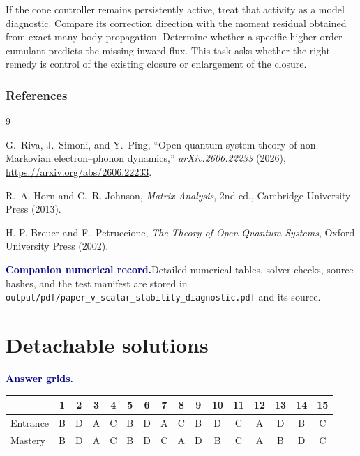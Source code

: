 \documentclass[10pt]{article}
\newcommand{\sourcepath}[1]{\nolinkurl{#1}}
\newcommand{\pedbox}[2]{%
  \par\medskip
  \noindent\colorbox{pale}{%
    \parbox{\dimexpr\linewidth-2\fboxsep\relax}{%
      \textcolor{navy}{\textbf{#1}}\quad #2%
    }%
  }\par\medskip
}
\newcommand{\flowlead}[1]{%
  \par\medskip
  \needspace{3\baselineskip}%
  \noindent\textcolor{navy}{\textbf{#1.}}\enspace\ignorespaces
}
\begin{document}
If the cone controller remains persistently active, treat that activity as a
model diagnostic.  Compare its correction direction with the moment residual
obtained from exact many-body propagation.  Determine whether a specific
higher-order cumulant predicts the missing inward flux.  This task asks
whether the right remedy is control of the existing closure or enlargement of
the closure.

\clearpage
\section*{References}

\begin{thebibliography}{9}

G.~Riva, J.~Simoni, and Y.~Ping,
\newblock ``Open-quantum-system theory of non-Markovian electron--phonon
dynamics,''
\newblock \emph{arXiv:2606.22233} (2026),
\newblock \url{https://arxiv.org/abs/2606.22233}.

R.~A. Horn and C.~R. Johnson,
\newblock \emph{Matrix Analysis}, 2nd ed.,
\newblock Cambridge University Press (2013).

H.-P. Breuer and F.~Petruccione,
\newblock \emph{The Theory of Open Quantum Systems},
\newblock Oxford University Press (2002).

\end{thebibliography}

\pedbox{Companion numerical record.}{Detailed numerical tables, solver
checks, source hashes, and the test manifest are stored in
\sourcepath{output/pdf/paper_v_scalar_stability_diagnostic.pdf} and its
source.}

\clearpage
\appendix
\part*{Detachable solutions}

\flowlead{Answer grids}

\begin{center}
\scriptsize
\setlength{\tabcolsep}{2.2pt}
\begin{tabular}{@{}lccccccccccccccc@{}}
\toprule
&1&2&3&4&5&6&7&8&9&10&11&12&13&14&15\\
\midrule
Entrance&B&D&A&C&B&D&A&C&B&D&C&A&D&B&C\\
Mastery&B&D&A&C&B&D&C&A&D&B&C&A&B&D&C\\
\bottomrule
\end{tabular}
\end{center}
\end{document}
